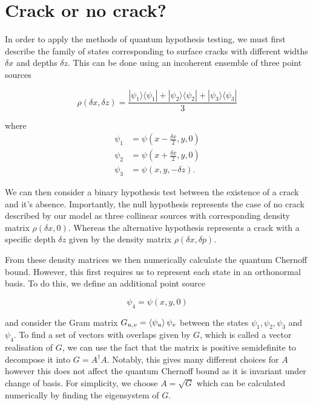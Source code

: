 \documentclass{article}
\newcommand{\ketbra}[2]{|#1\rangle\langle#2|}
\begin{document}
\section*{Crack or no crack?}

In order to apply the methods of quantum hypothesis testing, we must first describe the family of states corresponding to surface cracks with different widths $\delta x$ and depths $\delta z$. This can be done using an incoherent ensemble of three point sources

\begin{equation}
    \rho(\delta x, \delta z) = \frac{\ketbra{\psi_1}{\psi_1} + \ketbra{\psi_2}{\psi_2} + \ketbra{\psi_3}{\psi_3}}{3}
\end{equation}

where
\begin{equation}
    \begin{aligned}
        \psi_1 & = \psi(x\!-\!\frac{\delta x}{2},y,0)\\
        \psi_2 & = \psi(x\!+\!\frac{\delta x}{2},y,0)\\
        \psi_3 & = \psi(x,y,-\delta z).
    \end{aligned}
\end{equation}

We can then consider a binary hypothesis test between the existence of a crack and it's absence.
Importantly, the null hypothesis represents the case of no crack described by our model as three collinear sources with corresponding density matrix $\rho(\delta x, 0)$.
Whereas the alternative hypothesis represents a crack with a specific depth $\delta z$ given by the density matrix $\rho(\delta x, \delta p)$.

From these density matrices we then numerically calculate the quantum Chernoff bound.
However, this first requires us to represent each state in an orthonormal basis. To do this, we define an additional point source

\begin{equation}
    \psi_4 = \psi(x,y,0)
\end{equation}

and consider the Gram matrix $G_{u,v} = \braket{\psi_u}{\psi_v}$ between the states $\psi_1, \psi_2, \psi_3$ and $\psi_4$.
To find a set of vectors with overlaps given by $G$, which is called a vector realisation of $G$, we can use the fact that the matrix is positive semidefinite to decompose it into $G = A^\dagger A$.
Notably, this gives many different choices for $A$ however this does not affect the quantum Chernoff bound as it is invariant under change of basis. For simplicity, we choose $A = \sqrt{G}$ which can be calculated numerically by finding the eigensystem of $G$.
\end{document}
